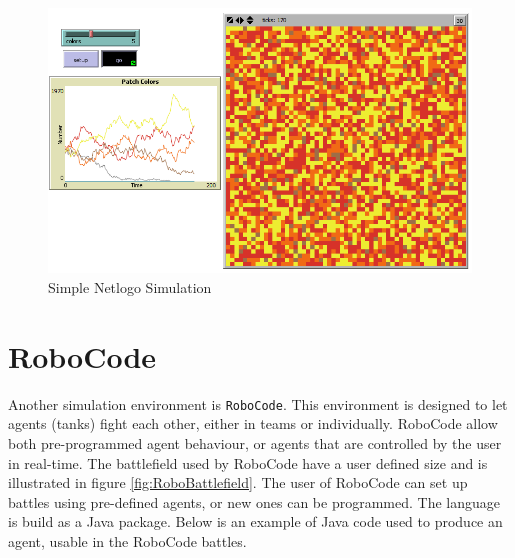 \begin{figure}[H]
\begin{center}
\includegraphics[scale=0.6]{Images/NetLogo.png}%
\end{center}
\caption{Simple Netlogo Simulation}%
\label{fig:NetLogoscreen}%
\end{figure}

\section{RoboCode}

Another simulation environment is \texttt{RoboCode}. This environment is designed to let agents (tanks) fight each other, either in teams or individually. RoboCode allow both pre-programmed agent behaviour, or agents that are controlled by the user in real-time. The battlefield used by RoboCode have a user defined size and is illustrated in figure \ref{fig:RoboBattlefield}. The user of RoboCode can set up battles using pre-defined agents, or new ones can be programmed. The language is build as a Java package. Below is an example of Java code used to produce an agent, usable in the RoboCode battles.

\begin{java}{The First part of a RoboCode robot. Note the robocode package is imported}{}
package lrn;
import robocode.*;

public class MyFirstRobot extends Robot {
\end{java}

